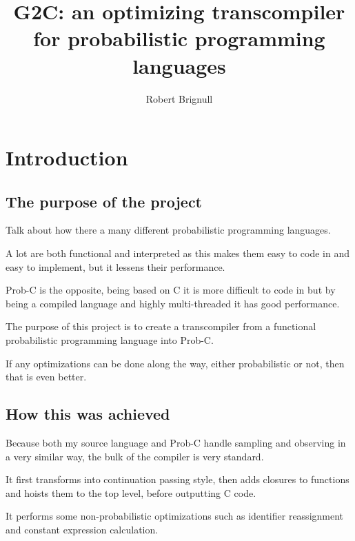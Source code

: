 \documentclass[a4paper]{article}
\title{G2C: an optimizing transcompiler for probabilistic programming languages}
\author{Robert Brignull}
\date{ }
\begin{document}
\maketitle


\section{Introduction}

\subsection{The purpose of the project}

Talk about how there a many different probabilistic programming languages.

A lot are both functional and interpreted as this makes them easy to code in and easy to implement, but it lessens their performance.

Prob-C is the opposite, being based on C it is more difficult to code in but by being a compiled language and highly multi-threaded it has good performance.

The purpose of this project is to create a transcompiler from a functional probabilistic programming language into Prob-C.

If any optimizations can be done along the way, either probabilistic or not, then that is even better.



\subsection{How this was achieved}

Because both my source language and Prob-C handle sampling and observing in a very similar way, the bulk of the compiler is very standard.

It first transforms into continuation passing style, then adds closures to functions and hoists them to the top level, before outputting C code.

It performs some non-probabilistic optimizations such as identifier reassignment and constant expression calculation.
\end{document}
